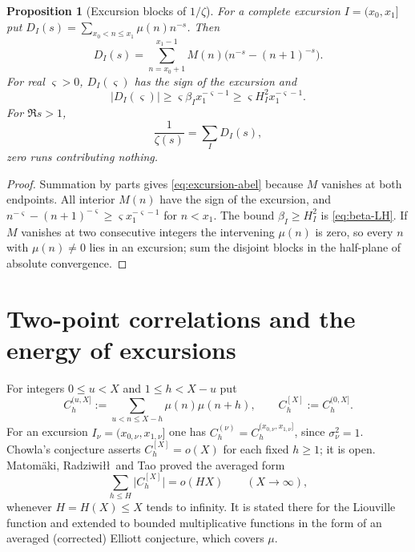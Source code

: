 \documentclass[11pt]{amsart}
\numberwithin{equation}{section}
\theoremstyle{plain}
\newtheorem{proposition}[theorem]{Proposition}
\theoremstyle{definition}
\theoremstyle{remark}
\begin{document}
\begin{proposition}[Excursion blocks of $1/\zeta$]
\label{prop:excursion-mellin}
For a complete excursion $I=(x_0,x_1]$ put
$D_I(s)=\sum_{x_0<n\le x_1}\mu(n)n^{-s}$. Then
\begin{equation}
\label{eq:excursion-abel}
D_I(s)=\sum_{n=x_0+1}^{x_1-1}M(n)
\bigl(n^{-s}-(n+1)^{-s}\bigr).
\end{equation}
For real $\varsigma>0$, $D_I(\varsigma)$ has the sign of the excursion and
\begin{equation}
\label{eq:excursion-mass-lower}
|D_I(\varsigma)|\ge
\varsigma\beta_I x_1^{-\varsigma-1}
\ge\varsigma H_I^2x_1^{-\varsigma-1}.
\end{equation}
For $\Re s>1$,
\begin{equation}
\label{eq:1overzeta-excursions}
\frac1{\zeta(s)}=\sum_I D_I(s),
\end{equation}
zero runs contributing nothing.
\end{proposition}

\begin{proof}
Summation by parts gives \eqref{eq:excursion-abel} because $M$ vanishes at
both endpoints. All interior $M(n)$ have the sign of the excursion, and
$n^{-\varsigma}-(n+1)^{-\varsigma}\ge\varsigma x_1^{-\varsigma-1}$ for $n<x_1$. The
bound $\beta_I\ge H_I^2$ is \eqref{eq:beta-LH}. If $M$ vanishes at two
consecutive integers the intervening $\mu(n)$ is zero, so every $n$ with
$\mu(n)\ne0$ lies in an excursion; sum the disjoint blocks in the
half-plane of absolute convergence.
\end{proof}

\section{Two-point correlations and the energy of excursions}
\label{sec:chowla}

For integers $0\le u<X$ and $1\le h<X-u$ put
\[
C^{(u,X]}_h:=\sum_{u<n\le X-h}\mu(n)\mu(n+h),\qquad
C^{[X]}_h:=C^{(0,X]}_h .
\]
For an excursion $I_\nu=(x_{0,\nu},x_{1,\nu}]$ one has
$C_h^{(\nu)}=C_h^{(x_{0,\nu},x_{1,\nu}]}$, since $\sigma_\nu^2=1$.
Chowla's conjecture asserts $C^{[X]}_h=o(X)$ for each fixed $h\ge1$; it is
open. Matom\"aki, Radziwi\l\l\ and Tao \cite{MRT15} proved the averaged form
\begin{equation}
\label{eq:MRT}
\sum_{h\le H}\bigl|C^{[X]}_h\bigr|=o(HX)\qquad(X\to\infty),
\end{equation}
whenever $H=H(X)\le X$ tends to infinity. It is stated there for the
Liouville function and extended to bounded multiplicative functions in the
form of an averaged (corrected) Elliott conjecture, which covers $\mu$.
\end{document}

